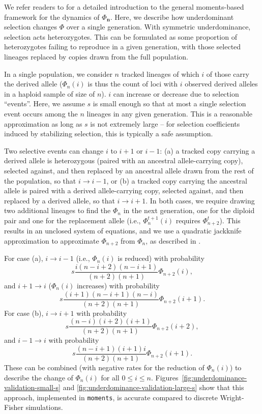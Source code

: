 \documentclass{article}
\newcommand{\moments}{\texttt{moments}\xspace}
\begin{document}
We refer readers to \citet{jouganous2017inferring} for a detailed introduction
to the general moments-based framework for the dynamics of \(\Phi_\mathbf{n}\).
Here, we describe how underdominant selection changes \(\Phi\) over a single
generation. With symmetric underdominance, selection acts heterozygotes. This
can be formulated as some proportion of heterozygotes failing to reproduce in a
given generation, with those selected lineages replaced by copies drawn from
the full population.

In a single population, we consider $n$ tracked lineages of which $i$ of those
carry the derived allele (\(\Phi_n(i)\) is thus the count of loci with $i$
observed derived alleles in a haploid sample of size of $n$). $i$ can increase
or decrease due to selection ``events''. Here, we assume $s$ is small enough so
that at most a single selection event occurs among the $n$ lineages in any
given generation. This is a reasonable approximation as long as $s$ is not
extremely large \citep{jouganous2017inferring} -- for selection coefficients
induced by stabilizing selection, this is typically a safe assumption.

Two selective events can change $i$ to $i+1$ or $i-1$: (a) a tracked copy
carrying a derived allele is heterozygous (paired with an ancestral
allele-carrying copy), selected against, and then replaced by an ancestral
allele drawn from the rest of the population, so that \(i\rightarrow i-1\), or
(b) a tracked copy carrying the ancestral allele is paired with a derived
allele-carrying copy, selected against, and then replaced by a derived allele,
so that \(i\rightarrow i+1\). In both cases, we require drawing two additional
lineages to find the \(\Phi_n\) in the next generation, one for the diploid
pair and one for the replacement allele (i.e., \(\Phi_n^{t+1}(i)\) requires
\(\Phi_{n+2}^t\)). This results in an unclosed system of equations, and we use
a quadratic jackknife approximation to approximate \(\Phi_{n+2}\) from
\(\Phi_n\), as described in \citet{jouganous2017inferring}.

For case (a), \(i\rightarrow i-1\) (i.e., \(\Phi_n(i)\) is reduced) with
probability \[s\frac{i(n-i+2)(n-i+1)}{(n+2)(n+1)}\Phi_{n+2}(i),\] and
\(i+1\rightarrow i\) (\(\Phi_n(i)\) increases) with probability
\[s\frac{(i+1)(n-i+1)(n-i)}{(n+2)(n+1)}\Phi_{n+2}(i+1).\] For case (b),
\(i\rightarrow i+1\) with probability
\[s\frac{(n-i)(i+2)(i+1)}{(n+2)(n+1)}\Phi_{n+2}(i+2),\] and \(i-1 \rightarrow
i\) with probability \[s\frac{(n-i+1)(i+1)i}{(n+2)(n+1)}\Phi_{n+2}(i+1).\]
These can be combined (with negative rates for the reduction of \(\Phi_n(i)\))
to describe the change of \(\Phi_n(i)\) for all \(0\leq i \leq n\).
Figures~\ref{fig:underdominance-validation-small-s} and
\ref{fig:underdominance-validation-large-s} show that this approach,
implemented in \moments, is accurate compared to discrete Wright-Fisher
simulations.
\end{document}
